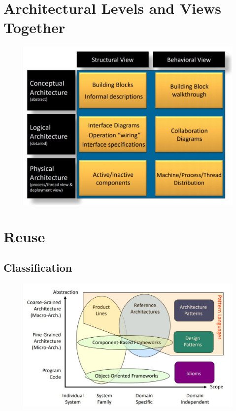 	\section{Architectural Levels and Views Together}
		\begin{figure}[h!]
			\includegraphics[scale=0.5]{res/arch-levels-and-views.jpg}
		\end{figure}
		

	\section{Reuse}
		\subsection*{Classification}
			\begin{figure}[h!]
				\includegraphics[scale=0.45]{res/reuse-classification.jpg}
			\end{figure}
		
		
		
		
		
	
	
	
	
	
	
	
	
	